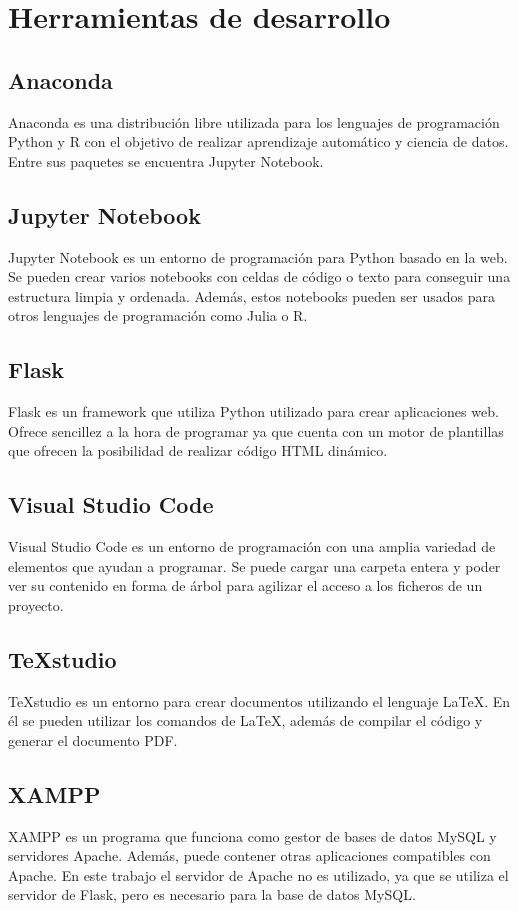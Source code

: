 \section{Herramientas de desarrollo}
\subsection{Anaconda}
Anaconda es una distribución libre utilizada para los lenguajes de programación Python y R con el objetivo de realizar aprendizaje automático y ciencia de datos. Entre sus paquetes se encuentra Jupyter Notebook.

\subsection{Jupyter Notebook}
Jupyter Notebook es un entorno de programación para Python basado en la web. Se pueden crear varios notebooks con celdas de código o texto para conseguir una estructura limpia y ordenada. Además, estos notebooks pueden ser usados para otros lenguajes de programación como Julia o R.

\subsection{Flask}
Flask es un framework que utiliza Python utilizado para crear aplicaciones web. Ofrece sencillez a la hora de programar ya que cuenta con un motor de plantillas que ofrecen la posibilidad de realizar código HTML dinámico.

\subsection{Visual Studio Code}
Visual Studio Code es un entorno de programación con una amplia variedad de elementos que ayudan a programar. Se puede cargar una carpeta entera y poder ver su contenido en forma de árbol para agilizar el acceso a los ficheros de un proyecto.

\subsection{TeXstudio}
TeXstudio es un entorno para crear documentos utilizando el lenguaje \LaTeX{}. En él se pueden utilizar los comandos de \LaTeX{}, además de compilar el código y generar el documento PDF.

\subsection{XAMPP}
XAMPP es un programa que funciona como gestor de bases de datos MySQL y servidores Apache. Además, puede contener otras aplicaciones compatibles con Apache. En este trabajo el servidor de Apache no es utilizado, ya que se utiliza el servidor de Flask, pero es necesario para la base de datos MySQL.

